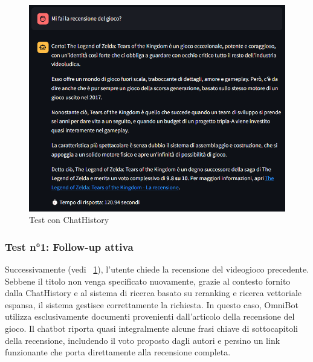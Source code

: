 \begin{figure}[!t]
    \centering
    \includegraphics[width=\textwidth]{Images/cap5/recensione_history.PNG}
    \caption{Test con ChatHistory}
    \label{fig:history2}
\end{figure}

\subsubsection{Test n°1: Follow-up attiva}
Successivamente (vedi \figurename{~\ref{fig:history2}}), l'utente chiede la recensione del videogioco precedente. Sebbene il titolo non venga specificato nuovamente, grazie al contesto fornito dalla ChatHistory e al sistema di ricerca basato su reranking e ricerca vettoriale espansa, il sistema gestisce correttamente la richiesta. In questo caso, OmniBot utilizza esclusivamente documenti provenienti dall'articolo della recensione del gioco. Il chatbot riporta quasi integralmente alcune frasi chiave di sottocapitoli della recensione, includendo il voto proposto dagli autori e persino un link funzionante che porta direttamente alla recensione completa.

